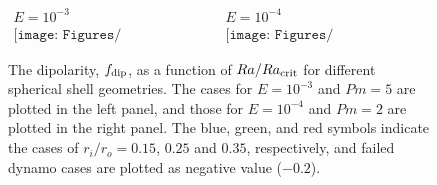 \begin{figure}
\begin{center}
\[
\begin{array}{cc}
\mbox{$E = 10^{-3}$} &
\mbox{$E = 10^{-4}$} \\
\texttt{[image: Figures/fdip\_vs\_RacRatio\_Ek3.pdf]} &
\texttt{[image: Figures/fdip\_vs\_RacRatio\_Ek4.pdf]}
\end{array}
\]
\end{center}
\caption{The dipolarity, $f_{\rm dip}$, as a function of $Ra / Ra_{\rm crit}$ for different spherical shell geometries.
The cases for $E = 10^{-3}$ and $Pm = 5$ are plotted in the left panel, and those for $E = 10^{-4}$ and $Pm = 2$ are plotted in the right panel.
The blue, green, and red symbols indicate the cases of $r_{i} / r_{o} = 0.15$, $0.25$ and $0.35$, respectively, and failed dynamo cases are plotted as negative value ($-0.2$).
}
\label{fig:fdip_vs_Racratio}
\end{figure}